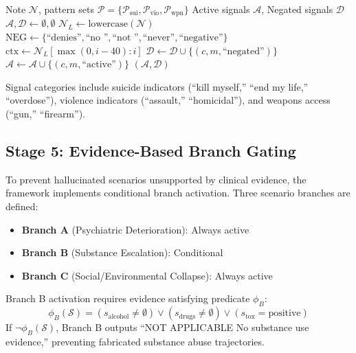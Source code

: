 \documentclass[conference]{IEEEtran}
\begin{document}
\begin{algorithm}[h]
\caption{Negation-Aware Signal Detection}
\label{alg:negation}
\begin{algorithmic}[1]
\REQUIRE Note $\mathcal{N}$, pattern sets $\mathcal{P} = \{\mathcal{P}_{\text{sui}}, \mathcal{P}_{\text{vio}}, \mathcal{P}_{\text{wpn}}\}$
\ENSURE Active signals $\mathcal{A}$, Negated signals $\mathcal{D}$
\STATE $\mathcal{A}, \mathcal{D} \leftarrow \emptyset, \emptyset$
\STATE $\mathcal{N}_L \leftarrow \text{lowercase}(\mathcal{N})$
\STATE $\text{NEG} \leftarrow \{\text{``denies''}, \text{``no ''}, \text{``not ''}, \text{``never''}, \text{``negative''}\}$
            \STATE $\text{ctx} \leftarrow \mathcal{N}_L[\max(0, i-40) : i]$
                \STATE $\mathcal{D} \leftarrow \mathcal{D} \cup \{(c, m, \text{``negated''})\}$
            \ELSE
                \STATE $\mathcal{A} \leftarrow \mathcal{A} \cup \{(c, m, \text{``active''})\}$
            \ENDIF
        \ENDFOR
    \ENDFOR
\ENDFOR
\RETURN $(\mathcal{A}, \mathcal{D})$
\end{algorithmic}
\end{algorithm}

Signal categories include suicide indicators (``kill myself,'' ``end my life,'' ``overdose''), violence indicators (``assault,'' ``homicidal''), and weapons access (``gun,'' ``firearm'').

\subsection{Stage 5: Evidence-Based Branch Gating}

To prevent hallucinated scenarios unsupported by clinical evidence, the framework implements conditional branch activation. Three scenario branches are defined:
\begin{itemize}
    \item \textbf{Branch A} (Psychiatric Deterioration): Always active
    \item \textbf{Branch B} (Substance Escalation): Conditional
    \item \textbf{Branch C} (Social/Environmental Collapse): Always active
\end{itemize}

Branch B activation requires evidence satisfying predicate $\phi_B$:
\begin{equation}
    \phi_B(\mathcal{S}) = (s_{\text{alcohol}} \neq \emptyset) \lor (s_{\text{drugs}} \neq \emptyset) \lor (s_{\text{tox}} = \text{positive})
\end{equation}
If $\neg \phi_B(\mathcal{S})$, Branch B outputs ``NOT APPLICABLE No substance use evidence,'' preventing fabricated substance abuse trajectories.
\end{document}
